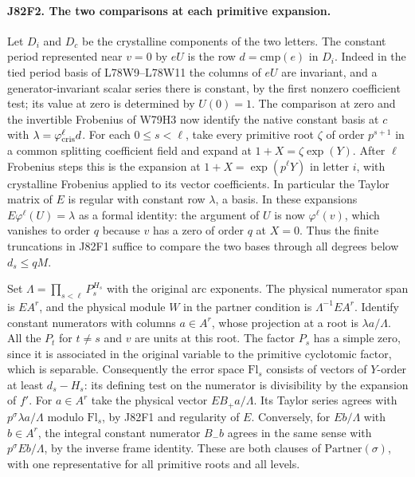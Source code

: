 \paragraph{J82F2. The two comparisons at each primitive expansion.}
Let $D_i$ and $D_c$ be the crystalline components of the two
letters. The constant period represented near $v=0$ by $eU$ is
the row $d=\mathrm{cmp}(e)$ in $D_i$. Indeed in the tied period
basis of L78W9--L78W11 the columns of $eU$ are invariant, and a
generator-invariant scalar series there is constant, by the
first nonzero coefficient test; its value at zero is determined
by $U(0)=1$. The comparison at zero and the invertible Frobenius
of W79H3 now identify the native constant basis at $c$ with
$\lambda=\varphi_{\rm cris}^\ell d$. For each $0\le s<\ell$,
take every primitive root $\zeta$ of order $p^{s+1}$ in a common
splitting coefficient field and expand at $1+X=\zeta\exp(Y)$.
After $\ell$ Frobenius steps this is the expansion at
$1+X=\exp(p^\ell Y)$ in letter $i$, with crystalline
Frobenius applied to its vector coefficients. In particular
the Taylor matrix of $E$ is regular with constant row
$\lambda$, a basis. In these expansions
$E\varphi^\ell(U)=\lambda$ as a formal identity: the argument
of $U$ is now $\varphi^\ell(v)$, which vanishes to order $q$
because $v$ has a zero of order $q$ at $X=0$.
Thus the finite truncations in J82F1 suffice to compare the
two bases through all degrees below $d_s\le qM$.

Set $\Lambda=\prod_{s<\ell}P_s^{H_s}$ with the original
arc exponents. The physical numerator span is $EA^r$, and the
physical module $W$ in the partner condition is $\Lambda^{-1}EA^r$.
Identify constant numerators with columns $a\in A^r$, whose
projection at a root is $\lambda a/\Lambda$. All the $P_t$
for $t\ne s$ and $v$ are units at this root. The factor $P_s$
has a simple zero, since it is associated in the original
variable to the primitive cyclotomic factor, which is separable.
Consequently the error space $\mathrm{Fl}_s$ consists of vectors
of $Y$-order at least $d_s-H_s$: its defining test on the
numerator is divisibility by the expansion of $f'$.
For $a\in A^r$ take the physical vector $EB_+a/\Lambda$.
Its Taylor series agrees with $p^\sigma\lambda a/\Lambda$
modulo $\mathrm{Fl}_s$, by J82F1 and regularity of $E$.
Conversely, for $Eb/\Lambda$ with $b\in A^r$, the integral
constant numerator $B_-b$ agrees in the same sense with
$p^\sigma Eb/\Lambda$, by the inverse frame identity.
These are both clauses of $\mathrm{Partner}(\sigma)$, with
one representative for all primitive roots and all levels.

